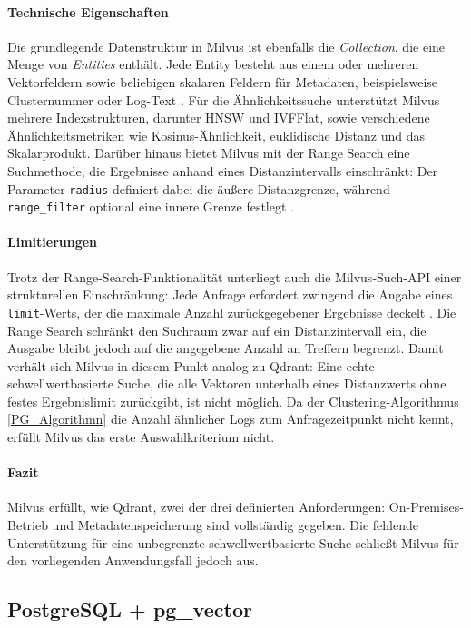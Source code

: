 \paragraph{Technische Eigenschaften}
Die grundlegende Datenstruktur in Milvus ist ebenfalls die \textit{Collection}, 
die eine Menge von \textit{Entities} enthält. Jede Entity besteht aus einem oder 
mehreren Vektorfeldern sowie beliebigen skalaren Feldern für Metadaten, 
beispielsweise Clusternummer oder Log-Text \cite{milvusdocs}. Für die 
Ähnlichkeitssuche unterstützt Milvus mehrere Indexstrukturen, darunter HNSW und 
IVFFlat, sowie verschiedene Ähnlichkeitsmetriken wie Kosinus-Ähnlichkeit, 
euklidische Distanz und das Skalarprodukt. Darüber hinaus bietet Milvus mit der 
Range Search eine Suchmethode, die Ergebnisse anhand eines Distanzintervalls 
einschränkt: Der Parameter \texttt{radius} definiert dabei die äußere 
Distanzgrenze, während \texttt{range\_filter} optional eine innere Grenze 
festlegt \cite{milvusdocs}.

\paragraph{Limitierungen}
Trotz der Range-Search-Funktionalität unterliegt auch die Milvus-Such-API einer 
strukturellen Einschränkung: Jede Anfrage erfordert zwingend die Angabe eines 
\texttt{limit}-Werts, der die maximale Anzahl zurückgegebener Ergebnisse 
deckelt \cite{milvussearch}. Die Range Search schränkt den Suchraum zwar auf ein 
Distanzintervall ein, die Ausgabe bleibt jedoch auf die angegebene Anzahl an 
Treffern begrenzt. Damit verhält sich Milvus in diesem Punkt analog zu Qdrant: 
Eine echte schwellwertbasierte Suche, die alle Vektoren unterhalb eines 
Distanzwerts ohne festes Ergebnislimit zurückgibt, ist nicht möglich. Da der 
Clustering-Algorithmus \ref{PG_Algorithmn} die Anzahl ähnlicher Logs zum 
Anfragezeitpunkt nicht kennt, erfüllt Milvus das erste Auswahlkriterium nicht.

\paragraph{Fazit}
Milvus erfüllt, wie Qdrant, zwei der drei definierten Anforderungen: 
On-Premises-Betrieb und Metadatenspeicherung sind vollständig gegeben. Die 
fehlende Unterstützung für eine unbegrenzte schwellwertbasierte Suche schließt 
Milvus für den vorliegenden Anwendungsfall jedoch aus.


\subsection{PostgreSQL + pg\_vector}

